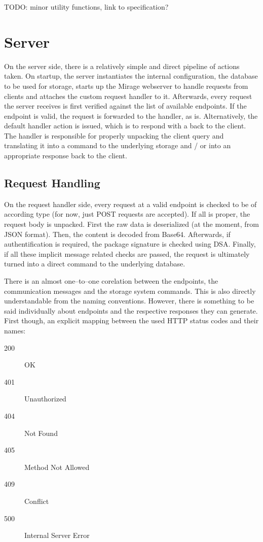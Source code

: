 TODO: minor utility functions, link to specification?

\section{Server}
On the server side, there is a relatively simple and direct pipeline of actions taken.
On startup, the server instantiates the internal configuration, the database to be used for storage, starts up the Mirage webserver to handle requests from clients and attaches the custom request handler to it.
Afterwards, every request the server receives is first verified against the list of available endpoints.
If the endpoint is valid, the request is forwarded to the handler, as is.
Alternatively, the default handler action is issued, which is to respond with a  back to the client.
The handler is responsible for properly unpacking the client query and translating it into a command to the underlying storage and / or into an appropriate response back to the client.

\subsection{Request Handling}
On the request handler side, every request at a valid endpoint is checked to be of according type (for now, just POST requests are accepted).
If all is proper, the request body is unpacked.
First the raw data is deserialized (at the moment, from JSON format).
Then, the content is decoded from Base64.
Afterwards, if authentification is required, the package signature is checked using DSA.
Finally, if all these implicit message related checks are passed, the request is ultimately turned into a direct command to the underlying database.

There is an almost one--to--one corelation between the endpoints, the communication messages and the storage system commands.
This is also directly understandable from the naming conventions.
However, there is something to be said individually about endpoints and the respective responses they can generate.
First though, an explicit mapping between the used HTTP status codes and their names:
\begin{description}
  \item[200] OK
  \item[401] Unauthorized
  \item[404] Not Found
  \item[405] Method Not Allowed
  \item[409] Conflict
  \item[500] Internal Server Error
\end{description}

